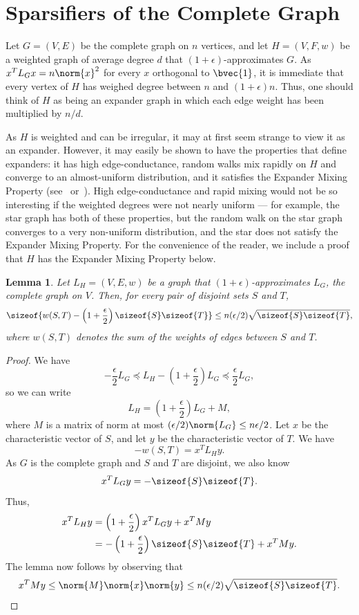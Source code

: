 \documentclass[12pt]{article}
\newtheorem{lemma}[theorem]{Lemma}
\begin{document}
\section{Sparsifiers of the Complete Graph}\label{sec:expanders}
Let $G = (V,E)$ be the complete graph on $n$ vertices,
  and let $H = (V,F,w)$ be a weighted graph of
  average degree $d$ that $(1+\epsilon )$-approximates
  $G$.
As $x^{T} L_{G} x = n \norm{x}^{2}$ for every $x$ orthogonal
  to $\bvec{1}$, it is immediate that every vertex of $H$
  has weighed degree between $n$ and $(1+\epsilon) n$.
Thus, one should think of $H$ as being an expander graph in which
  each edge weight has been multiplied by $n/d$.

As $H$ is weighted and can be irregular, it may at first seem
  strange to view it as an expander.
However, it may easily be shown to have the properties that define
   expanders: it has high edge-conductance,
  random walks mix rapidly on $H$ and converge to an almost-uniform distribution,  and it satisfies the
  Expander Mixing Property (see~\cite{AlonChung} 
  or~\cite[Lemma 2.5]{ExpanderSurvey}).
High edge-conductance and rapid mixing would not be so interesting if
  the weighted degrees were not nearly uniform ---
for example, the star graph has both of these properties,
but the random walk on the star graph converges to a very non-uniform
  distribution, and the star does not satisfy the Expander Mixing Property.
For the convenience of the reader, we include a proof that $H$
  has the Expander Mixing Property below.
\begin{lemma}\label{lem:mixing}
Let $L_{H} = (V,E,w)$ be a graph
  that $( 1+\epsilon )$-approximates $L_{G}$,
  the complete graph on $V$.
Then, for every pair of disjoint sets $S$ and $T$,
\[
  \sizeof{w (S,T) - \left(1 + \frac{\epsilon}{2} \right) \sizeof{S} \sizeof{T}} 
\leq n (\epsilon/2)  \sqrt{\sizeof{S} \sizeof{T}},
\]
where $w (S,T)$ denotes the sum of the weights of edges
  between $S$ and $T$.
\end{lemma}
\begin{proof}
We have
\[
  - \frac{\epsilon}{2} L_{G} 
\preceq
  L_{H} - \left(1+\frac{\epsilon}{2} \right) L_{G}
\preceq
  \frac{\epsilon}{2} L_{G},
\]
so
  we can write 
\[
L_{H} =  \left(1+\frac{\epsilon}{2} \right) L_{G} + M,
\]
  where $M$ is a matrix of norm at most 
 $(\epsilon /2) \norm{L_{G}} \leq n \epsilon /2$.
Let $x$ be the characteristic vector of $S$, and let
  $y$ be the characteristic vector of $T$.
We have
\[
  - w (S,T) = x^{T} L_{H} y.
\]
As $G$ is the complete graph and $S$ and $T$ are disjoint, we also know
\[
  x^{T} L_{G} y = - \sizeof{S} \sizeof{T}.
\]
Thus,
\begin{align*}
 x^{T} L_{H} y 
& = 
  \left(1+\frac{\epsilon}{2} \right) x^{T} L_{G} y
  + x^{T} M y\\
& = 
 - \left(1+\frac{\epsilon}{2} \right) \sizeof{S} \sizeof{T}
  + x^{T} M y.
\end{align*}
The lemma now follows by observing that
\[
 x^{T} M y
\leq 
 \norm{M} \norm{x} \norm{y}
\leq 
 n (\epsilon /2) \sqrt{\sizeof{S} \sizeof{T}}.
\]
\end{proof}
\end{document}
